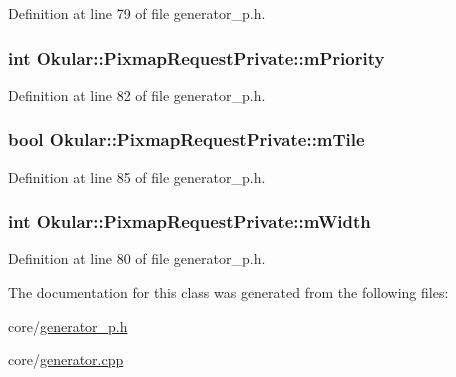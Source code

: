 Definition at line 79 of file generator\+\_\+p.\+h.

\hypertarget{classOkular_1_1PixmapRequestPrivate_a9d9712057a03c6148d820d57b6840d4a}{
\subsubsection[{m\+Priority}]{\setlength{\rightskip}{0pt plus 5cm}int Okular\+::\+Pixmap\+Request\+Private\+::m\+Priority}}\label{classOkular_1_1PixmapRequestPrivate_a9d9712057a03c6148d820d57b6840d4a}


Definition at line 82 of file generator\+\_\+p.\+h.

\hypertarget{classOkular_1_1PixmapRequestPrivate_a194cda451fbff515b1c939048ee5a096}{
\subsubsection[{m\+Tile}]{\setlength{\rightskip}{0pt plus 5cm}bool Okular\+::\+Pixmap\+Request\+Private\+::m\+Tile}}\label{classOkular_1_1PixmapRequestPrivate_a194cda451fbff515b1c939048ee5a096}


Definition at line 85 of file generator\+\_\+p.\+h.

\hypertarget{classOkular_1_1PixmapRequestPrivate_a7b18925fda75ddbca63144cd1f31a096}{
\subsubsection[{m\+Width}]{\setlength{\rightskip}{0pt plus 5cm}int Okular\+::\+Pixmap\+Request\+Private\+::m\+Width}}\label{classOkular_1_1PixmapRequestPrivate_a7b18925fda75ddbca63144cd1f31a096}


Definition at line 80 of file generator\+\_\+p.\+h.



The documentation for this class was generated from the following files\+:\begin{DoxyCompactItemize}
\item 
core/\hyperlink{generator__p_8h}{generator\+\_\+p.\+h}\item 
core/\hyperlink{generator_8cpp}{generator.\+cpp}\end{DoxyCompactItemize}
